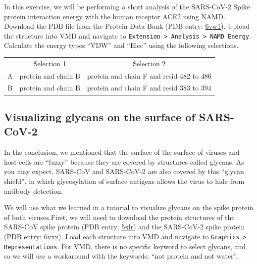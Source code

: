 In this exercise, we will be performing a short analysis of the SARS-CoV-2 Spike protein interaction energy with the human receptor ACE2 using NAMD. Download the PDB file from the Protein Data Bank (PDB entry: \href{https://www.rcsb.org/structure/6vw1}{6vw1}). Upload the structure into VMD and navigate to \texttt{Extension > Analysis > NAMD Energy}. Calculate the energy types ``VDW'' and ``Elec'' using the following selections.\\

\begin{center}
\mySfFamily
\begin{tabular}{c c c}
& Selection 1 & Selection 2\\
A & protein and chain B & protein and chain F and resid 482 to 486\\
B & protein and chain B & protein and chain F and resid 383 to 394
\end{tabular}
\end{center}

\begin{exercise}\end{exercise}

\subsection{Visualizing glycans on the surface of SARS-CoV-2}

In the conclusion, we mentioned that the surface of the surface of viruses and host cells are ``fuzzy'' because they are covered by structures called glycans. As you may expect, SARS-CoV and SARS-CoV-2 are also covered by this ``glycan shield'', in which glycosylation of surface antigens allows the virus to hide from antibody detection.

We will use what we learned in a tutorial to visualize glycans on the spike protein of both viruses. First, we will need to download the protein structures of the SARS-CoV spike protein (PDB entry: \href{https://www.rcsb.org/structure/5xlr}{5xlr}) and the SARS-CoV-2 spike protein (PDB entry: \href{https://www.rcsb.org/structure/6vxx}{6vxx}). Load each structure into VMD and navigate to \texttt{Graphics > Representations}. For VMD, there is no specific keyword to select glycans, and so we will use a workaround with the keywords: ``not protein and not water''.\\

